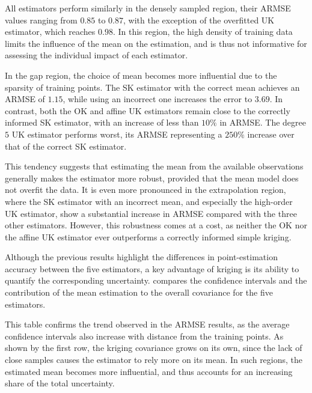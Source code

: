 All estimators perform similarly in the densely sampled region, their ARMSE values ranging from $0.85$ to $0.87$, with the exception of the overfitted UK estimator, which reaches $0.98$. In this region, the high density of training data limits the influence of the mean on the estimation, and is thus not informative for assessing the individual impact of each estimator.

In the gap region, the choice of mean becomes more influential due to the sparsity of training points. The SK estimator with the correct mean achieves an ARMSE of $1.15$, while using an incorrect one increases the error to $3.69$. In contrast, both the OK and affine UK estimators remain close to the correctly informed SK estimator, with an increase of less than $10\%$ in ARMSE. The degree $5$ UK estimator performs worst, its ARMSE representing a $250\%$ increase over that of the correct SK estimator.

This tendency suggests that estimating the mean from the available observations generally makes the estimator more robust, provided that the mean model does not overfit the data. It is even more pronounced in the extrapolation region, where the SK estimator with an incorrect mean, and especially the high-order UK estimator, show a substantial increase in ARMSE compared with the three other estimators. However, this robustness comes at a cost, as neither the OK nor the affine UK estimator ever outperforms a correctly informed simple kriging.

Although the previous results highlight the differences in point-estimation accuracy between the five estimators, a key advantage of kriging is its ability to quantify the corresponding uncertainty.  compares the confidence intervals and the contribution of the mean estimation to the overall covariance for the five estimators.

\begin{table}[!htb]
	\centering
	\caption{Average confidence interval half-width and average share of the covariance caused by the estimation of the mean for the five estimators over each region. The share is computed as the pointwise ratio of $\mathbf{R}_{\hat{m}}$ over $\mathbf{R}_{\mathrm{K}}=\mathbf{R}_{\hat{m}}+\mathbf{R}_{\mathrm{SK}}$.}\label{tab:kriging_covariance}
\end{table}

This table confirms the trend observed in the ARMSE results, as the average confidence intervals also increase with distance from the training points. As shown by the first row, the kriging covariance grows on its own, since the lack of close samples causes the estimator to rely more on its mean. In such regions, the estimated mean becomes more influential, and thus accounts for an increasing share of the total uncertainty.

